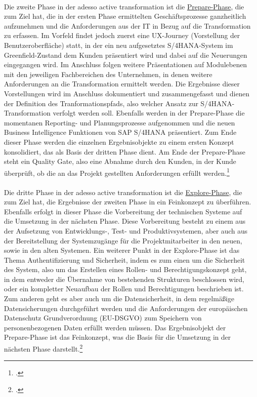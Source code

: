 \\Die zweite Phase in der adesso active transformation ist die \underline{\glqq{}Prepare\grqq{}-Phase}, die zum Ziel hat, die in der ersten Phase ermittelten Geschäftsprozesse ganzheitlich aufzunehmen und die Anforderungen aus der IT in Bezug auf die Transformation zu erfassen. Im Vorfeld findet jedoch zuerst eine UX-Journey (Vorstellung der Benutzeroberfläche) statt, in der ein neu aufgesetztes S/4HANA-System im Greenfield-Zustand dem Kunden präsentiert wird und dabei auf die Neuerungen eingegangen wird. Im Anschluss folgen weitere Präsentationen auf Modulebenen mit den jeweiligen Fachbereichen des Unternehmen, in denen weitere Anforderungen an die Transformation ermittelt werden. Die Ergebnisse dieser Vorstellungen wird im Anschluss dokumentiert und zusammengefasst und dienen der Definition des Tranformationspfads, also welcher Ansatz zur S/4HANA-Transformation verfolgt werden soll. Ebenfalls werden in der Prepare-Phase die momentanen Reporting- und Planungsprozesse aufgenommen und die neuen Business Intelligence Funktionen von SAP S/4HANA präsentiert. Zum Ende dieser Phase werden die einzelnen Ergebnisobjekte zu einem ersten Konzept konsolidiert, das als Basis der dritten Phase dient. Am Ende der Prepare-Phase steht ein \glqq{}Quality Gate\grqq{}, also eine Abnahme durch den Kunden, in der Kunde überprüft, ob die an das Projekt gestellten Anforderungen erfüllt werden.\footcite[Vgl.][]{aat-prepare}\\
\vspace{1em}
\\Die dritte Phase in der adesso active transformation ist die \underline{\glqq{}Explore\grqq{}-Phase}, die zum Ziel hat, die Ergebnisse der zweiten Phase in ein Feinkonzept zu überführen. Ebenfalls erfolgt in dieser Phase die Vorbereitung der technischen Systeme auf die Umsetzung in der nächsten Phase. Diese Vorbereitung besteht zu einem aus der Aufsetzung von Entwicklungs-, Test- und Produktivsystemen, aber auch aus der Bereitstellung der Systemzugänge für die Projektmitarbeiter in den neuen, sowie in den alten Systemen. Ein weiterer Punkt in der Explore-Phase ist das Thema Authentifizierung und Sicherheit, indem es zum einen um die Sicherheit des System, also um das Erstellen eines Rollen- und Berechtigungskonzept geht, in dem entweder die Übernahme von bestehenden Strukturen beschlossen wird, oder ein kompletter Neuaufbau der Rollen und Berechtigungen beschrieben ist. Zum anderen geht es aber auch um die Datensicherheit, in dem regelmäßige Datensicherungen durchgeführt werden und die Anforderungen der europäischen Datenschutz Grundverordnung (EU-DSGVO) zum Speichern von personenbezogenen Daten erfüllt werden müssen. Das Ergebnisobjekt der Prepare-Phase ist das Feinkonzept, was die Basis für die Umsetzung in der nächsten Phase darstellt.\footcite[Vgl.][]{aat-explore}\\
